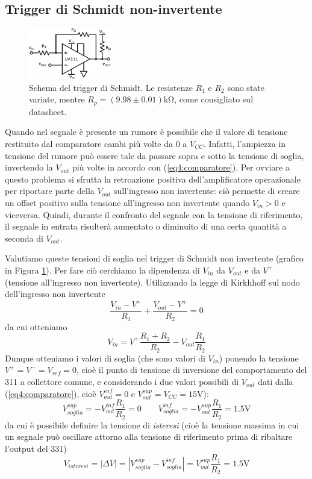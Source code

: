 \subsection{Trigger di Schmidt non-invertente}

\begin{figure}
  \begin{center}
    \includegraphics[width=0.320\textwidth]{../E04/latex/c_schmidt.pdf}
  \end{center}
  \caption{Schema del trigger di Schmidt. Le resistenze $R_1$ e $R_2$ sono state variate, mentre $R_p=(9.98 \pm 0.01)$\si{\kilo\ohm}, come consigliato sul datasheet.}
  \label{cir4:schmidt}
\end{figure}

Quando nel segnale è presente un rumore è possibile che il valore di tensione restituito dal comparatore cambi più volte da $0$ a $V_{CC}$. Infatti, l'ampiezza in tensione del rumore può essere tale da passare sopra e sotto la tensione di soglia, invertendo la $V_{out}$ più volte in accordo con (\ref{eq4:comparatore}). Per ovviare a questo problema si sfrutta la retroazione positiva dell'amplificatore operazionale per riportare parte della $V_{out}$ sull'ingresso non invertente: ciò permette di creare un offset positivo sulla tensione all'ingresso non invertente quando $V_{in}>0$ e viceversa. Quindi, durante il confronto del segnale con la tensione di riferimento, il segnale in entrata risulterà aumentato o diminuito di una certa quantità a seconda di $V_{out}$.

Valutiamo queste tensioni di soglia nel trigger di Schmidt non invertente (grafico in Figura \ref{cir4:schmidt}). Per fare ciò cerchiamo la dipendenza di $V_{in}$ da $V_{out}$ e da $V^+$ (tensione all'ingresso non invertente). Utilizzando la legge di Kirkhhoff sul nodo dell'ingresso non invertente
$$\frac{V_{in}-V^+}{R_1} + \frac{V_{out}-V^+}{R_2} = 0$$
da cui otteniamo
\begin{equation}
V_{in} = V^+ \frac{R_1+R_2}{R_2} - V_{out} \frac{R_1}{R_2}
\label{eq4:v_in_parte2}
\end{equation}
Dunque otteniamo i valori di soglia (che sono valori di $V_{in}$) ponendo la tensione $V^+=V^-=V_{ref}=0$, cioè il punto di tensione di inversione del comportamento del 311 a collettore comune, e considerando i due valori possibili di $V_{out}$ dati dalla (\ref{eq4:comparatore}), cioè $V_{out}^{inf}=0$ e $V_{out}^{sup}=V_{CC}=15$\si{\volt}):
$$V_{soglia}^{sup} = - V_{out}^{inf} \frac{R_1}{R_2} = 0 \qquad V_{soglia}^{inf} = - V_{out}^{sup} \frac{R_1}{R_2} = 1.5 \si{\volt}$$
da cui è possibile definire la tensione di \textit{isteresi} (cioè la tensione massima in cui un segnale può oscillare attorno alla tensione di riferimento prima di ribaltare l'output del 331)
$$V_{isteresi} = |\Delta V| = |V_{soglia}^{sup} - V_{soglia}^{inf}| = V_{out}^{sup} \frac{R_1}{R_2} = 1.5 \si{\volt}$$

